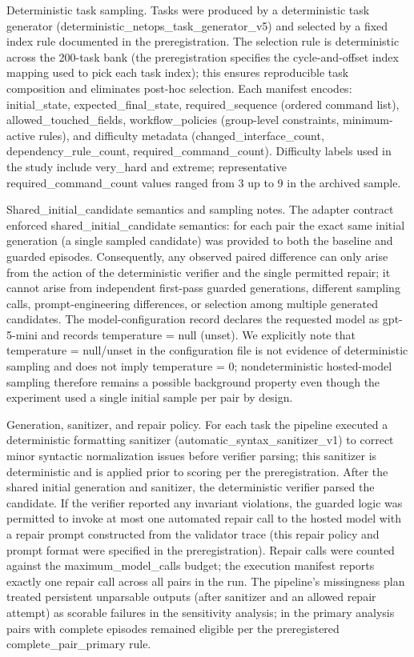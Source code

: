 \documentclass[conference]{IEEEtran}
\begin{document}
Deterministic task sampling. Tasks were produced by a deterministic task generator (deterministic\_netops\_task\_generator\_v5) and selected by a fixed index rule documented in the preregistration. The selection rule is deterministic across the 200-task bank (the preregistration specifies the cycle-and-offset index mapping used to pick each task index); this ensures reproducible task composition and eliminates post-hoc selection. Each manifest encodes: initial\_state, expected\_final\_state, required\_sequence (ordered command list), allowed\_touched\_fields, workflow\_policies (group-level constraints, minimum-active rules), and difficulty metadata (changed\_interface\_count, dependency\_rule\_count, required\_command\_count). Difficulty labels used in the study include very\_hard and extreme; representative required\_command\_count values ranged from 3 up to 9 in the archived sample.

Shared\_initial\_candidate semantics and sampling notes. The adapter contract enforced shared\_initial\_candidate semantics: for each pair the exact same initial generation (a single sampled candidate) was provided to both the baseline and guarded episodes. Consequently, any observed paired difference can only arise from the action of the deterministic verifier and the single permitted repair; it cannot arise from independent first-pass guarded generations, different sampling calls, prompt-engineering differences, or selection among multiple generated candidates. The model-configuration record declares the requested model as gpt-5-mini and records temperature = null (unset). We explicitly note that temperature = null/unset in the configuration file is not evidence of deterministic sampling and does not imply temperature = 0; nondeterministic hosted-model sampling therefore remains a possible background property even though the experiment used a single initial sample per pair by design.

Generation, sanitizer, and repair policy. For each task the pipeline executed a deterministic formatting sanitizer (automatic\_syntax\_sanitizer\_v1) to correct minor syntactic normalization issues before verifier parsing; this sanitizer is deterministic and is applied prior to scoring per the preregistration. After the shared initial generation and sanitizer, the deterministic verifier parsed the candidate. If the verifier reported any invariant violations, the guarded logic was permitted to invoke at most one automated repair call to the hosted model with a repair prompt constructed from the validator trace (this repair policy and prompt format were specified in the preregistration). Repair calls were counted against the maximum\_model\_calls budget; the execution manifest reports exactly one repair call across all pairs in the run. The pipeline's missingness plan treated persistent unparsable outputs (after sanitizer and an allowed repair attempt) as scorable failures in the sensitivity analysis; in the primary analysis pairs with complete episodes remained eligible per the preregistered complete\_pair\_primary rule.
\end{document}
